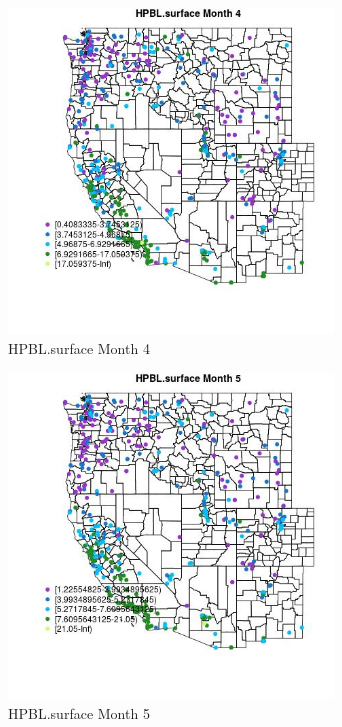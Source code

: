 \begin{figure} 
\centering  
\includegraphics[width=0.77\textwidth]{Code_Outputs/ML_input_report_ML_input_PM25_Step5_part_d_de_duplicated_aves_ML_input_MapObsMo4HPBLsurface.jpg} 
\caption{\label{fig:ML_input_report_ML_input_PM25_Step5_part_d_de_duplicated_aves_ML_inputMapObsMo4HPBLsurface}HPBL.surface Month 4} 
\end{figure} 
 

\begin{figure} 
\centering  
\includegraphics[width=0.77\textwidth]{Code_Outputs/ML_input_report_ML_input_PM25_Step5_part_d_de_duplicated_aves_ML_input_MapObsMo5HPBLsurface.jpg} 
\caption{\label{fig:ML_input_report_ML_input_PM25_Step5_part_d_de_duplicated_aves_ML_inputMapObsMo5HPBLsurface}HPBL.surface Month 5} 
\end{figure} 
 

